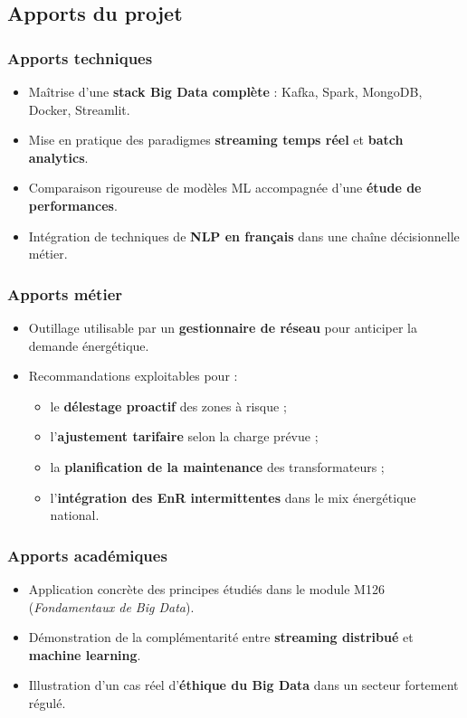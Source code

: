 \documentclass[11pt,a4paper]{article}
\begin{document}
\subsection{Apports du projet}

\subsubsection{Apports techniques}
\begin{itemize}
  \item Maîtrise d'une \textbf{stack Big Data complète} : Kafka, Spark, MongoDB, Docker, Streamlit.
  \item Mise en pratique des paradigmes \textbf{streaming temps réel} et \textbf{batch analytics}.
  \item Comparaison rigoureuse de modèles ML accompagnée d'une \textbf{étude de performances}.
  \item Intégration de techniques de \textbf{NLP en français} dans une chaîne décisionnelle métier.
\end{itemize}

\subsubsection{Apports métier}
\begin{itemize}
  \item Outillage utilisable par un \textbf{gestionnaire de réseau} pour anticiper la demande énergétique.
  \item Recommandations exploitables pour :
    \begin{itemize}
      \item le \textbf{délestage proactif} des zones à risque ;
      \item l'\textbf{ajustement tarifaire} selon la charge prévue ;
      \item la \textbf{planification de la maintenance} des transformateurs ;
      \item l'\textbf{intégration des EnR intermittentes} dans le mix énergétique national.
    \end{itemize}
\end{itemize}

\subsubsection{Apports académiques}
\begin{itemize}
  \item Application concrète des principes étudiés dans le module M126 (\emph{Fondamentaux de Big Data}).
  \item Démonstration de la complémentarité entre \textbf{streaming distribué} et \textbf{machine learning}.
  \item Illustration d'un cas réel d'\textbf{éthique du Big Data} dans un secteur fortement régulé.
\end{itemize}
\end{document}
